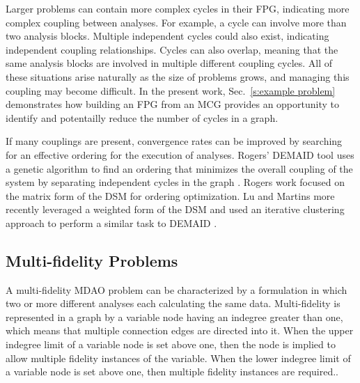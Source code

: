   Larger problems can contain more complex cycles in their FPG, indicating more 
  complex coupling between analyses. For example, a cycle can involve more than 
   two analysis blocks. Multiple independent cycles could also exist, indicating 
  independent coupling relationships. Cycles can also overlap, meaning that the same analysis 
  blocks are involved in multiple different coupling cycles. All of these situations
  arise naturally as the size of problems grows, and managing this coupling may
  become difficult. In the present work, Sec.~\ref{s:example problem}
  demonstrates how building an FPG from an MCG provides an opportunity to 
  identify and potentailly reduce the number of cycles in a graph. 

  If many couplings are present, convergence rates can be improved by 
  searching for an effective ordering for the execution of analyses.
  Rogers' DEMAID tool uses a genetic algorithm to find an ordering that minimizes 
  the overall coupling of the system by separating independent cycles in the 
  graph \cite{rogers1996,rogers1996demaid}. Rogers work focused on the matrix 
  form of the DSM for ordering optimization. Lu and Martins more recently leveraged 
  a weighted form of the DSM and used an iterative clustering approach to perform a 
  similar task to DEMAID \cite{Lu2012}.

\subsection{Multi-fidelity Problems}
  \label{ss:multi-fideliy problems}
  A multi-fidelity MDAO problem can be characterized by a formulation in which two or more different analyses 
  each calculating the same data. Multi-fidelity is represented in a graph by a variable node having an indegree greater than one, which means that multiple connection edges are directed into it. When the upper indegree limit of a variable node is set above one, then the node is implied to allow multiple fidelity instances of the variable. When the lower indegree limit of a variable node is set above one, then multiple fidelity instances are required..
%

